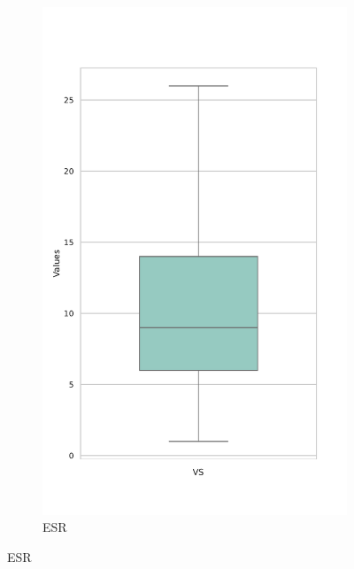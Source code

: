 \documentclass[jou]{apa7}
\newcommand{\subfigwidth}{0.2\textwidth}
\begin{document}
\begin{figure}[H]
\begin{subfigure}[b]{\subfigwidth}
		\includegraphics[width=\linewidth]{Box_Plot_of_VS.pdf}
		\caption{ESR}
		\label{fig:BoxPlotVS}
	\end{subfigure}

	\vspace{1em} %


\end{figure}
\end{document}

